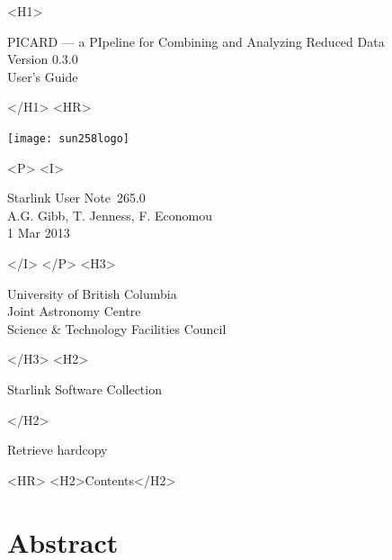 \documentclass[twoside,11pt]{article}
\newcommand{\stardoccategory}  {Starlink User Note}
\newcommand{\stardocsource}    {sun\stardocnumber}
\newcommand{\stardocnumber}    {265.0}
\newcommand{\stardocauthors}   {A.G. Gibb, T. Jenness, F. Economou}
\newcommand{\stardocdate}      {1 Mar 2013}
\newcommand{\stardoctitle}     {PICARD --- a PIpeline for Combining and Analyzing Reduced Data}
\newcommand{\stardocversion}   {Version 0.3.0}
\newcommand{\stardocmanual}    {User's Guide}
\newcommand{\htmladdnormallink}[2]{#1}
\newcommand{\htmladdimg}[1]{}
\newcommand{\htmlref}[2]{#1}
\newcommand{\htmladdtonavigation}[1]{}
\newcommand{\xlabel}[1]{}
\renewcommand{\_}{\texttt{\symbol{95}}}
\begin{document}
\begin{htmlonly}
   \xlabel{}
   \begin{rawhtml} <H1> \end{rawhtml}
      \stardoctitle\\
      \stardocversion\\
      \stardocmanual
   \begin{rawhtml} </H1> <HR> \end{rawhtml}

\texttt{[image: sun258\_logo]}

   \begin{rawhtml} <P> <I> \end{rawhtml}
   \stardoccategory\ \stardocnumber \\
   \stardocauthors \\
   \stardocdate
   \begin{rawhtml} </I> </P> <H3> \end{rawhtml}
      \htmladdnormallink{University of British Columbia}
                        {http://www.ubc.ca} \\
      \htmladdnormallink{Joint Astronomy Centre}
                        {http://www.jach.hawaii.edu}\\
      \htmladdnormallink{Science \& Technology Facilities Council}
                        {http://www.stfc.ac.uk} \\
   \begin{rawhtml} </H3> <H2> \end{rawhtml}
      \htmladdnormallink{Starlink Software Collection}{http://starlink.jach.hawaii.edu/}
   \begin{rawhtml} </H2> \end{rawhtml}
   \htmladdnormallink{\htmladdimg{source.gif} Retrieve hardcopy}
      {http://starlink.jach.hawaii.edu/cgi-bin/hcserver?\stardocsource}\\

  \label{stardoccontents}
  \begin{rawhtml}
    <HR>
    <H2>Contents</H2>
  \end{rawhtml}
  \htmladdtonavigation{\htmlref{\htmladdimg{contents_motif.gif}}
        {stardoccontents}}

  \section{\xlabel{abstract}Abstract}
\end{htmlonly}
\end{document}
